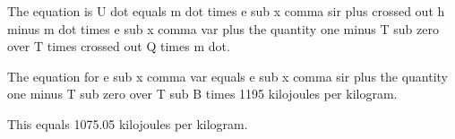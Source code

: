 The equation is U dot equals m dot times e sub x comma sir plus crossed out h minus m dot times e sub x comma var plus the quantity one minus T sub zero over T times crossed out Q times m dot.

The equation for e sub x comma var equals e sub x comma sir plus the quantity one minus T sub zero over T sub B times 1195 kilojoules per kilogram.

This equals 1075.05 kilojoules per kilogram.